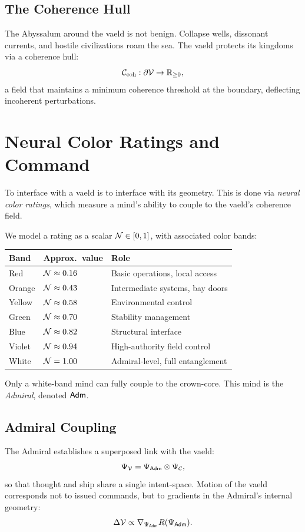 \subsection{The Coherence Hull}
The Abyssalum around the vaeld is not benign. Collapse wells, dissonant currents, and hostile
civilizations roam the sea. The vaeld protects its kingdoms via a coherence hull:
\[
\mathcal{C}_{\mathrm{coh}} : \partial \mathcal{V} \rightarrow \mathbb{R}_{\ge 0},
\]
a field that maintains a minimum coherence threshold at the boundary, deflecting incoherent
perturbations.

\section{Neural Color Ratings and Command}
To interface with a vaeld is to interface with its geometry. This is done via \emph{neural color
ratings}, which measure a mind's ability to couple to the vaeld's coherence field.

We model a rating as a scalar $\mathcal{N} \in [0,1]$, with associated color bands:

\begin{center}
\begin{tabular}{lll}
Band & Approx.\ value & Role \\
\hline
Red    & $\mathcal{N} \approx 0.16$ & Basic operations, local access \\
Orange & $\mathcal{N} \approx 0.43$ & Intermediate systems, bay doors \\
Yellow & $\mathcal{N} \approx 0.58$ & Environmental control \\
Green  & $\mathcal{N} \approx 0.70$ & Stability management \\
Blue   & $\mathcal{N} \approx 0.82$ & Structural interface \\
Violet & $\mathcal{N} \approx 0.94$ & High-authority field control \\
White  & $\mathcal{N} = 1.00$       & Admiral-level, full entanglement \\
\end{tabular}
\end{center}

Only a white-band mind can fully couple to the crown-core. This mind is the \emph{Admiral},
denoted $\mathsf{Adm}$.

\subsection{Admiral Coupling}
The Admiral establishes a superposed link with the vaeld:
\[
\Psi_{\mathcal{V}} = \Psi_{\mathsf{Adm}} \otimes \Psi_{\mathcal{C}},
\]
so that thought and ship share a single intent-space. Motion of the vaeld corresponds not to
issued commands, but to gradients in the Admiral's internal geometry:
\[
\Delta \mathcal{V} \propto \nabla_{\Psi_{\mathsf{Adm}}} R(\Psi_{\mathsf{Adm}}).
\]


